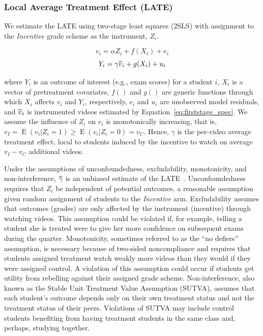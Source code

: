 \documentclass[12pt]{article}
\newcommand\wh[1]{\hstretch{2}{\hat{\hstretch{.5}{#1}}}}
\begin{document}
\subsubsection{Local Average Treatment Effect (LATE)}

We estimate the LATE using two-stage least squares (2SLS) with assignment to the \textit{Incentive} grade scheme as the instrument, $Z_i$.

\begin{equation} \label{eq:firststage_spec}
	v_i = \alpha Z_i + f(X_i) + e_i
\end{equation}
\begin{equation} \label{eq:secondstage_spec}
	Y_i = \gamma \wh{v}_i + g(X_i) + u_i
\end{equation}

where $Y_i$ is an outcome of interest (e.g., exam scores) for a student $i$, $X_i$ is a vector of pretreatment covariates, $f()$ and $g()$ are generic functions through which $X_i$ affects $v_i$ and $Y_i$, respectively, $e_i$ and $u_i$ are unobserved model residuals, and $\wh{v}_i$ is instrumented videos estimated by Equation~\ref{eq:firststage_spec}.
We assume the influence of $Z_i$ on $v_i$ is monotonically increasing, that is, $v_I = \operatorname{E}(v_i|Z_i=1) \geq \operatorname{E}(v_i|Z_i=0) = v_C$.
Hence, $\gamma$ is the per-video average treatment effect, local to students induced by the incentive to watch on average $v_I - v_C$ additional videos.

Under the assumptions of unconfoundedness, excludability, monotonicity, and non-interference, $\wh{\gamma}$ is an unbiased estimate of the LATE~\parencite{ai1995}.
Unconfoundedness requires that $Z_i$ be independent of potential outcomes, a reasonable assumption given random assignment of students to the \textit{Incentive} arm.
Excludability assumes that outcomes (grades) are only affected by the instrument (incentive) through watching videos.
This assumption could be violated if, for example, telling a student she is treated were to give her more confidence on subsequent exams during the quarter.
Monotonicity, sometimes referred to as the ``no defiers'' assumption, is necessary because of two-sided noncompliance and requires that students assigned treatment watch weakly more videos than they would if they were assigned control.
A violation of this assumption could occur if students get utility from rebelling against their assigned grade scheme.
Non-interference, also known as the Stable Unit Treatment Value Assumption (SUTVA), assumes that each student's outcome depends only on their own treatment status and not the treatment status of their peers.
Violations of SUTVA may include control students benefiting from having treatment students in the same class and, perhaps, studying together.
\end{document}
